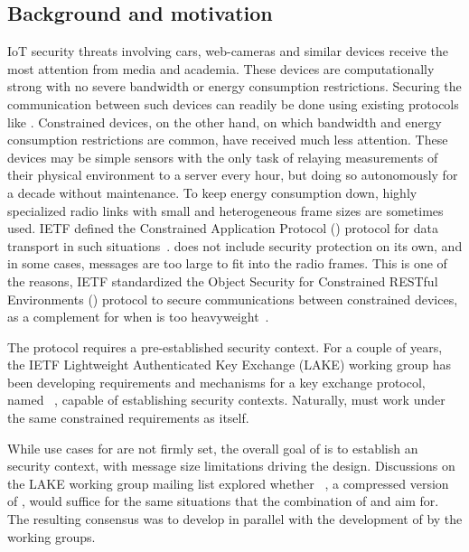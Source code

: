 \documentclass[runningheads, envcountsame, a4paper, draft, x11names]{llncs}
\newcommand{\fillhack}{\vspace{-0.5em}}
\begin{document}
\subsection{Background and motivation}
\label{sec:motivation}
\fillhack
IoT security threats involving cars, web-cameras and similar devices
receive the most attention from media and academia.
%
These devices are computationally strong with no severe bandwidth or energy
consumption restrictions.
%
Securing the communication between such devices can readily be done using
existing protocols like \mDandTls.
%
Constrained devices, on the other hand, on which bandwidth and
energy consumption restrictions are common, have received much less attention.
%
These devices may be simple sensors with the only task of relaying
measurements of their physical environment to a server every hour, but doing so
autonomously for a decade without maintenance.
%
To keep energy consumption down, highly specialized radio links with small
and heterogeneous frame sizes are sometimes used.
%
IETF defined the Constrained Application Protocol (\mCoap{}) protocol for data
transport in such situations~\cite{rfc7252}.
%
\mCoap{} does not include security protection on its own, and in some cases,
\mDandTls{} messages are too large to fit into the radio frames.
%
This is one of the reasons, IETF standardized the Object Security for
Constrained RESTful Environments (\mOscore{}) protocol to secure
communications between constrained devices, as a complement for when
\mDandTls{} is too heavyweight~\cite{rfc8613}.
%

The \mOscore{} protocol requires a pre-established security context.
%
For a couple of years, the IETF Lightweight Authenticated Key Exchange (LAKE)
working group has been developing requirements and mechanisms for a key
exchange protocol, named \mEdhoc~\cite{selander-lake-edhoc-01}, capable of
establishing \mOscore{} security contexts.
%
Naturally, \mEdhoc{} must work under the same constrained requirements as
\mOscore{} itself.
%

While use cases for \mEdhoc{} are not firmly set, the overall goal of \mEdhoc{}
is to establish an \mOscore{} security context, with message size limitations
driving the design.
%
Discussions on the LAKE working group mailing list explored whether
\mCtls~\cite{ietf-tls-ctls-00}, a compressed version of \mTls, would suffice
for the same situations that the combination of \mOscore{} and \mEdhoc{} aim
for.
%
The resulting consensus was to develop \mEdhoc{} in parallel with the
development of \mCtls{} by the \mTls{} working groups.
%
\end{document}
